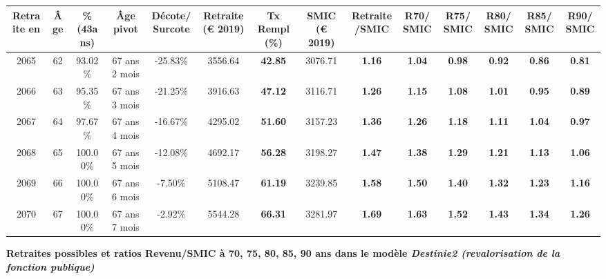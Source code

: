 \begin{adjustbox}{max width=\textwidth} 
\begin{tabular}[htb]{|c|c||c|c|c||c|c||c|c||c|c|c|c|c|} 
\hline 
 Retraite en &  Âge &  \%(43ans) &  Âge pivot &  Décote/Surcote &  Retraite (\euro{} 2019) &  Tx Rempl(\%) &  SMIC (\euro{} 2019) &  Retraite/SMIC &  R70/SMIC &  R75/SMIC &  R80/SMIC &  R85/SMIC &  R90/SMIC \\ 
\hline \hline 
 2065 &  62 &  93.02\% &  67 ans 2 mois &  -25.83\% &  3556.64 &  {\bf 42.85} &  3076.71 &  {\bf 1.16} &  {\bf 1.04} &  {\bf {\color{red} 0.98}} &  {\bf {\color{red} 0.92}} &  {\bf {\color{red} 0.86}} &  {\bf {\color{red} 0.81}} \\ 
\hline 
 2066 &  63 &  95.35\% &  67 ans 3 mois &  -21.25\% &  3916.63 &  {\bf 47.12} &  3116.71 &  {\bf 1.26} &  {\bf 1.15} &  {\bf 1.08} &  {\bf 1.01} &  {\bf {\color{red} 0.95}} &  {\bf {\color{red} 0.89}} \\ 
\hline 
 2067 &  64 &  97.67\% &  67 ans 4 mois &  -16.67\% &  4295.02 &  {\bf 51.60} &  3157.23 &  {\bf 1.36} &  {\bf 1.26} &  {\bf 1.18} &  {\bf 1.11} &  {\bf 1.04} &  {\bf {\color{red} 0.97}} \\ 
\hline 
 2068 &  65 &  100.00\% &  67 ans 5 mois &  -12.08\% &  4692.17 &  {\bf 56.28} &  3198.27 &  {\bf 1.47} &  {\bf 1.38} &  {\bf 1.29} &  {\bf 1.21} &  {\bf 1.13} &  {\bf 1.06} \\ 
\hline 
 2069 &  66 &  100.00\% &  67 ans 6 mois &  -7.50\% &  5108.47 &  {\bf 61.19} &  3239.85 &  {\bf 1.58} &  {\bf 1.50} &  {\bf 1.40} &  {\bf 1.32} &  {\bf 1.23} &  {\bf 1.16} \\ 
\hline 
 2070 &  67 &  100.00\% &  67 ans 7 mois &  -2.92\% &  5544.28 &  {\bf 66.31} &  3281.97 &  {\bf 1.69} &  {\bf 1.63} &  {\bf 1.52} &  {\bf 1.43} &  {\bf 1.34} &  {\bf 1.26} \\ 
\hline 
\hline 
\end{tabular} 
\end{adjustbox} 
 
 \vspace{0.1cm} 
{\bf \noindent Retraites possibles et ratios Revenu/SMIC à 70, 75, 80, 85, 90 ans dans le modèle \emph{Destinie2 (revalorisation de la fonction publique)}}  
 
